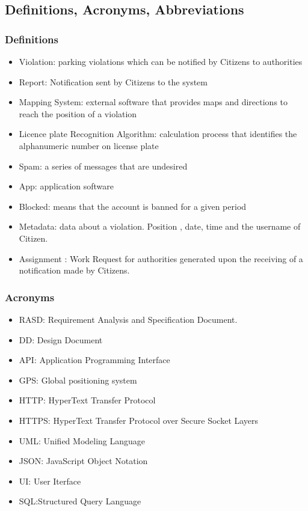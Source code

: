 \subsection{Definitions, Acronyms, Abbreviations}
\subsubsection {Definitions}
\begin{itemize}
\item	Violation: parking violations which can be notified by Citizens to authorities
\item	Report: Notification sent by Citizens to the system
\item	Mapping System: external software that provides maps and directions to reach the position of a violation
\item	Licence plate Recognition Algorithm: calculation process that identifies the alphanumeric number on license plate
\item	Spam: a series of messages that are undesired
\item	App: application software 
\item	Blocked: means that the account is banned for a given period
\item	Metadata: data about a violation. Position , date,  time and the username of Citizen. 
\item	Assignment : Work Request for authorities generated upon the receiving of a notification made by Citizens.
\end{itemize}
	\subsubsection {Acronyms}
\begin{itemize}
\item	RASD: Requirement Analysis and Specification Document.
\item      DD: Design Document
\item	API: Application Programming Interface
\item	GPS: Global positioning system
\item	HTTP: HyperText Transfer Protocol
\item	HTTPS: HyperText Transfer Protocol over Secure Socket Layers
\item	UML: Unified Modeling Language
\item 	JSON: JavaScript Object Notation
\item 	UI: User Iterface
\item 	SQL:Structured Query Language

\end{itemize}
